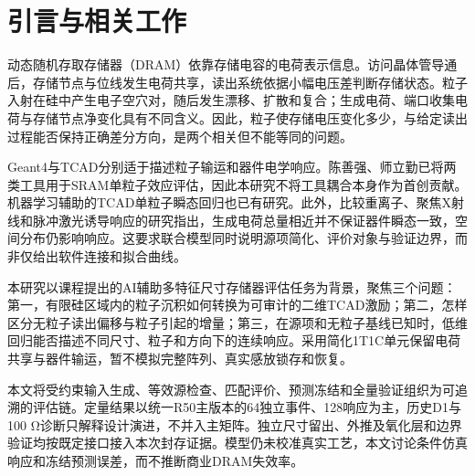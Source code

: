 \section{引言与相关工作}
动态随机存取存储器（DRAM）依靠存储电容的电荷表示信息。访问晶体管导通后，存储节点与位线发生电荷共享，读出系统依据小幅电压差判断存储状态\cite{keeth2001}。粒子入射在硅中产生电子空穴对，随后发生漂移、扩散和复合；生成电荷、端口收集电荷与存储节点净变化具有不同含义\cite{label1996}。因此，粒子使存储电压变化多少，与给定读出过程能否保持正确差分方向，是两个相关但不能等同的问题。

Geant4与TCAD分别适于描述粒子输运和器件电学响应。陈善强、师立勤已将两类工具用于SRAM单粒子效应评估\cite{chen2011}，因此本研究不将工具耦合本身作为首创贡献。机器学习辅助的TCAD单粒子瞬态回归也已有研究\cite{xu2021}。此外，比较重离子、聚焦X射线和脉冲激光诱导响应的研究指出，生成电荷总量相近并不保证器件瞬态一致，空间分布仍影响响应\cite{ryder2021}。这要求联合模型同时说明源项简化、评价对象与验证边界，而非仅给出软件连接和拟合曲线。

本研究以课程提出的AI辅助多特征尺寸存储器评估任务为背景\cite{course}，聚焦三个问题：第一，有限硅区域内的粒子沉积如何转换为可审计的二维TCAD激励；第二，怎样区分无粒子读出偏移与粒子引起的增量；第三，在源项和无粒子基线已知时，低维回归能否描述不同尺寸、粒子和方向下的连续响应。采用简化1T1C单元保留电荷共享与器件输运，暂不模拟完整阵列、真实感放锁存和恢复。

本文将受约束输入生成、等效源检查、匹配评价、预测冻结和全量验证组织为可追溯的评估链。定量结果以统一R50主版本的64独立事件、128响应为主，历史D1与100 Ω诊断只解释设计演进，不并入主矩阵。独立尺寸留出、外推及氧化层和边界验证均按既定接口接入本次封存证据。模型仍未校准真实工艺，本文讨论条件仿真响应和冻结预测误差，而不推断商业DRAM失效率。
